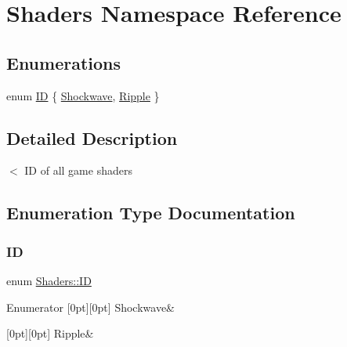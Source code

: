 \hypertarget{namespace_shaders}{}\section{Shaders Namespace Reference}
\label{namespace_shaders}
\subsection*{Enumerations}
\begin{DoxyCompactItemize}
\item 
enum \hyperlink{namespace_shaders_ac69c86b4e324fdda75990b34e9a1dc7e}{ID} \{ \hyperlink{namespace_shaders_ac69c86b4e324fdda75990b34e9a1dc7eaf02a64b9b6206367e82aae811cd52d1b}{Shockwave}, 
\hyperlink{namespace_shaders_ac69c86b4e324fdda75990b34e9a1dc7eaa670629dfa701b0829eec82754034c35}{Ripple}
 \}
\end{DoxyCompactItemize}


\subsection{Detailed Description}
$<$ ID of all game shaders 

\subsection{Enumeration Type Documentation}
\mbox{\label{namespace_shaders_ac69c86b4e324fdda75990b34e9a1dc7e}} 
\subsubsection{\texorpdfstring{ID}{ID}}
{\footnotesize\ttfamily enum \hyperlink{namespace_shaders_ac69c86b4e324fdda75990b34e9a1dc7e}{Shaders\+::\+ID}}

\begin{DoxyEnumFields}{Enumerator}
[0pt][0pt]{}\mbox{\label{namespace_shaders_ac69c86b4e324fdda75990b34e9a1dc7eaf02a64b9b6206367e82aae811cd52d1b}} 
Shockwave&\\
\hline

[0pt][0pt]{}\mbox{\label{namespace_shaders_ac69c86b4e324fdda75990b34e9a1dc7eaa670629dfa701b0829eec82754034c35}} 
Ripple&\\
\hline

\end{DoxyEnumFields}
